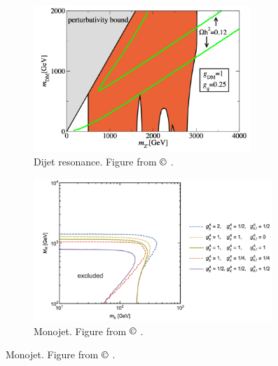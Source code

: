 \begin{figure}[hp]
	\centering
\begin{subfigure}[t]{0.45\textwidth}
	\centering
	\includegraphics[width=0.9\textwidth]{Figures/2/Zprime_constrants_dijet.pdf}
\caption{Dijet resonance. Figure from $\copyright$ \cite{Zprime_portal_dijet}.}
\label{fig:Zprime_constraints_dijet}
\end{subfigure}
\begin{subfigure}[t]{0.54\textwidth}
	\centering
	\includegraphics[width=0.99\textwidth]{Figures/2/Zprime_constrants_monojet.pdf}
\caption{Monojet. Figure from $\copyright$ \cite{Zprime_portal_monojet_dijet}.}
\label{fig:Zprime_constraints_monojet}
\end{subfigure}

\end{figure}
